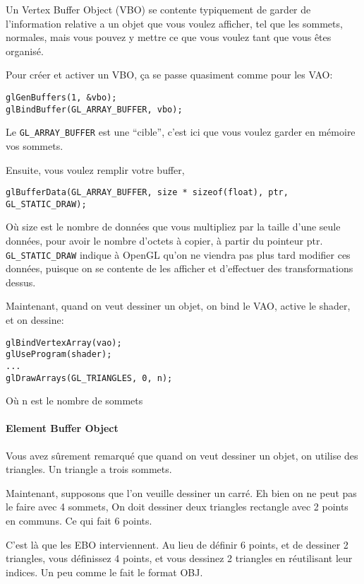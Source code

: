 \documentclass[11pt, a4paper, titlepage]{article}
\begin{document}
Un Vertex Buffer Object (VBO) se contente typiquement de garder de l'information relative a un objet que vous voulez afficher, tel que les sommets, normales, mais 
vous pouvez y mettre ce que vous voulez tant que vous êtes organisé.

Pour créer et activer un VBO, ça se passe quasiment comme pour les VAO:

\begin{lstlisting}
glGenBuffers(1, &vbo);
glBindBuffer(GL_ARRAY_BUFFER, vbo);
\end{lstlisting}

Le \texttt{GL\_ARRAY\_BUFFER} est une ``cible'', c'est ici que vous voulez garder en mémoire vos sommets.

Ensuite, vous voulez remplir votre buffer,

\begin{lstlisting}
glBufferData(GL_ARRAY_BUFFER, size * sizeof(float), ptr, GL_STATIC_DRAW);
\end{lstlisting}

Où size est le nombre de données que vous multipliez par la taille d'une seule données, pour avoir le nombre d'octets à copier, à partir du pointeur ptr.
\texttt{GL\_STATIC\_DRAW} indique à OpenGL qu'on ne viendra pas plus tard modifier ces données, puisque on se contente de les afficher et d'effectuer des transformations dessus.

Maintenant, quand on veut dessiner un objet, on bind le VAO, active le shader, et on dessine:

\begin{lstlisting}
glBindVertexArray(vao);
glUseProgram(shader);
...
glDrawArrays(GL_TRIANGLES, 0, n);
\end{lstlisting}

Où n est le nombre de sommets

\paragraph{Element Buffer Object\\}

Vous avez sûrement remarqué que quand on veut dessiner un objet, on utilise des triangles.
Un triangle a trois sommets.

Maintenant, supposons que l'on veuille dessiner un carré. Eh bien on ne peut pas le faire avec 4 sommets, 
On doit dessiner deux triangles rectangle avec 2 points en communs. Ce qui fait 6 points.

C'est là que les EBO interviennent. Au lieu de définir 6 points, et de dessiner 2 triangles, vous définissez 4 points, et vous dessinez 2 triangles en réutilisant leur indices.
Un peu comme le fait le format OBJ.
\end{document}
